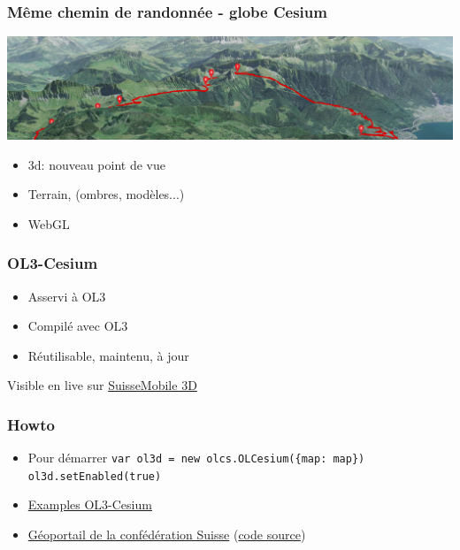 \documentclass{beamer}
\begin{document}
  \begin{frame}
    \frametitle{Même chemin de randonnée - globe Cesium}
	\begin{center}
	  \includegraphics[width=1.0 \linewidth]{./vtt_3d2_half.png}
	\end{center}
	\pause
	
    \begin{itemize}
      \item 3d: nouveau point de vue
      \item Terrain, (ombres, modèles...)
      \item WebGL
    \end{itemize}
  \end{frame}

  
  \begin{frame}
    \frametitle{OL3-Cesium}

    \begin{itemize}
      \item Asservi à OL3
      \item Compilé avec OL3
      \item Réutilisable, maintenu, à jour
    \end{itemize}

     \pause
     Visible en live sur \href{https://map.schweizmobil.ch/?cesium&trackId=2149217}{SuisseMobile 3D}
    
    \end{frame}

  
  \begin{frame}
    \frametitle{Howto}
    
    \begin{itemize}
      \item Pour démarrer \newline
	    \texttt{var ol3d = new olcs.OLCesium(\{map: map\})}\newline
	    \texttt{ol3d.setEnabled(true)}\newline
      \pause
      \item \href{http://openlayers.org/ol3-cesium/examples/}{Examples OL3-Cesium}
      \pause
      \item \href{https://map.geo.admin.ch/}{Géoportail de la confédération Suisse} (\href{https://github.com/geoadmin/mf-geoadmin3}{code source})
    \end{itemize}
  \end{frame}
\end{document}
